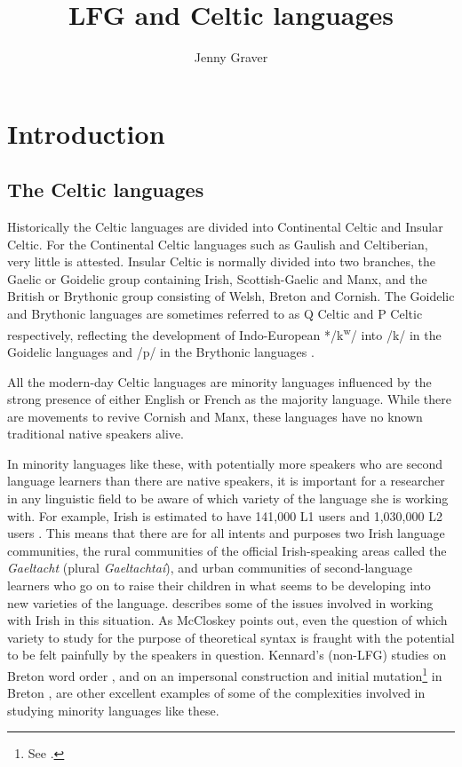 \documentclass[output=paper,colorlinks,citecolor=brown]{langscibook}
\title{LFG and Celtic languages}
\author{Jenny Graver\affiliation{University of Oslo}}
\begin{document}
\maketitle
\label{chap:Celtic}

\section{Introduction}
\label{sec:Celtic:1}

\subsection{The Celtic languages}
\label{sec:Celtic:1.1}

Historically the Celtic languages are divided into Continental Celtic and Insular Celtic. For the Continental Celtic languages such as Gaulish and Celtiberian, very little is attested. Insular Celtic is normally divided into two branches, the Gaelic or Goidelic group containing Irish, Scottish-Gaelic and Manx, and the British or Brythonic group consisting of Welsh, Breton and Cornish. The Goidelic and Brythonic languages are sometimes referred to as Q Celtic and P Celtic respectively, reflecting the development of Indo-European */k\textsuperscript{w}/ into /k/ in the Goidelic languages and /p/ in the Brythonic languages \citep[68]{Schmidt2002}.

All the modern-day Celtic languages are minority languages influenced by the strong presence of either English or French as the majority language. While there are movements to revive Cornish and Manx, these languages have no known traditional native speakers alive.

In minority languages like these, with potentially more speakers who are second language learners than there are native speakers, it is important for a researcher in any linguistic field to be aware of which variety of the language she is working with. For example, Irish is estimated to have 141,000 L1 users and 1,030,000 L2 users \citep{EberhardSimonsFennig2019}. This means that there are for all intents and purposes two Irish language communities, the rural communities of the official Irish-speaking areas called the \emph{Gaeltacht} (plural \emph{Gaeltachtaí}), and urban communities of second-language learners who go on to raise their children in what seems to be developing into new varieties of the language. \citet{McCloskey2003} describes some of the issues involved in working with Irish in this situation. As McCloskey points out, even the question of which variety to study for the purpose of theoretical syntax is fraught with the potential to be felt painfully by the speakers in question. Kennard's (non-LFG) studies on Breton word order \citep{Kennard2014}, and on an impersonal construction and initial mutation\footnote{See .} in Breton \citep{Kennard2019}, are other excellent examples of some of the complexities involved in studying minority languages like these.
\end{document}
